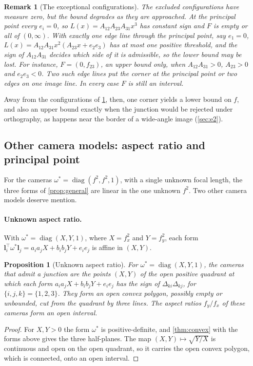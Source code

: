 \documentclass[pdflatex,sn-mathphys-num,iicol]{sn-jnl}
\newcommand{\vl}{\mathbf{l}}
\theoremstyle{thmstyleone}
\newtheorem{proposition}[theorem]{Proposition}
\theoremstyle{thmstylethree}
\theoremstyle{thmstyletwo}
\newtheorem{remark}[theorem]{Remark}
\begin{document}
\begin{remark}[The exceptional configurations]\label{rem:exceptional}
The excluded configurations have measure zero, but the bound degrades as they are approached. At the principal point every $e_i=0$, so $L(x)=A_{12}A_{23}A_{31}x^3$ has constant sign and $F$ is empty or all of $(0,\infty)$. With exactly one edge line through the principal point, say $e_1=0$, $L(x)=A_{12}A_{31}x^2(A_{23}x+e_2e_3)$ has at most one positive threshold, and the sign of $A_{12}A_{31}$ decides which side of it is admissible, so the lower bound may be lost. For instance, $F=(0,f_{23})$, an upper bound only, when $A_{12}A_{31}>0$, $A_{23}>0$ and $e_2e_3<0$. Two such edge lines put the corner at the principal point or two edges on one image line. In every case $F$ is still an interval.
\end{remark}

Away from the configurations of \cref{rem:exceptional}, then, one corner yields a lower bound on $f$, and also an upper bound exactly when the junction would be rejected under orthography, as happens near the border of a wide-angle image (\cref{sec:e2}).


\subsection{Other camera models: aspect ratio and principal point}\label{sec:slices}

For the cameras $\omega^{*}=\operatorname{diag}(f^2,f^2,1)$, with a single unknown focal length, the three forms of \cref{prop:general} are linear in the one unknown $f^2$. Two other camera models deserve mention.

\paragraph{Unknown aspect ratio.} With $\omega^{*}=\operatorname{diag}(X,Y,1)$, where $X=f_x^2$ and $Y=f_y^2$, each form $\vl_i^{\top}\omega^{*}\vl_j=a_ia_jX+b_ib_jY+e_ie_j$ is affine in $(X,Y)$.

\begin{proposition}[Unknown aspect ratio]\label{prop:aspect}
For $\omega^{*}=\operatorname{diag}(X,Y,1)$, the cameras that admit a junction are the points $(X,Y)$ of the open positive quadrant at which each form $a_ia_jX+b_ib_jY+e_ie_j$ has the sign of $\Delta_{ki}\Delta_{kj}$, for $\{i,j,k\}=\{1,2,3\}$. They form an open convex polygon, possibly empty or unbounded, cut from the quadrant by three lines. The aspect ratios $f_y/f_x$ of these cameras form an open interval.
\end{proposition}
\begin{proof}
For $X,Y>0$ the form $\omega^{*}$ is positive-definite, and \cref{thm:convex} with the forms above gives the three half-planes. The map $(X,Y)\mapsto\sqrt{Y/X}$ is continuous and open on the open quadrant, so it carries the open convex polygon, which is connected, onto an open interval.
\end{proof}
\end{document}
